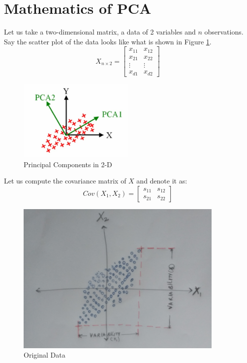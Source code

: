 \documentclass[12pt,a4paper]{report}
\begin{document}
\section{Mathematics of PCA}

Let us take a two-dimensional matrix, a data of 2 variables and $n$ observations. Say the scatter plot of the data looks like what is shown in Figure \ref{FigPCA2}. 
\[ X_{n \times 2} = 
\begin{bmatrix}
    x_{11} & x_{12}  \\
    x_{21} & x_{22}  \\
    \vdots & \vdots  \\
    x_{d1} & x_{d2} 
\end{bmatrix}
\]

\begin{figure}[!ht] \label{FigPCA2}
    \centering
    \includegraphics[width = 0.5\textwidth]{SVM/SVMImages/PCA3.jpg}
    \caption{Principal Components in 2-D}
\end{figure}
Let us compute the covariance matrix of $X$ and denote it as:
\[ Cov(X_{1},X_{2}) = 
\begin{bmatrix}
    s_{11} & s_{12}  \\
    s_{21} & s_{22}  
\end{bmatrix}
\]
\begin{figure}[!ht] \label{FigPCA3}
    \centering
    \includegraphics[width = 0.9\textwidth]{SVM/SVMImages/PCA1.PNG}
    \caption{Original Data}
\end{figure}
\end{document}
